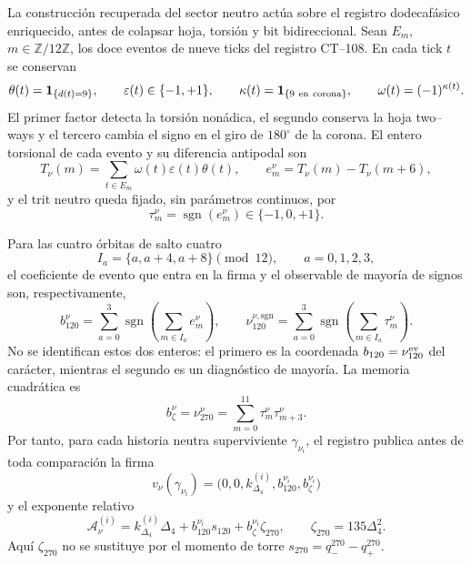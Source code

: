 La construcción recuperada del sector neutro actúa sobre el registro
dodecafásico enriquecido, antes de colapsar hoja, torsión y bit
bidireccional. Sean \(E_m\), \(m\in\mathbb Z/12\mathbb Z\), los doce
eventos de nueve ticks del registro CT--108. En cada tick \(t\) se conservan
\[
 \theta(t)=\mathbf1_{\{d(t)=9\}},\qquad
 \varepsilon(t)\in\{-1,+1\},\qquad
 \kappa(t)=\mathbf1_{\{9\ {\rm en\ corona}\}},
 \qquad \omega(t)=(-1)^{\kappa(t)}.
\]
El primer factor detecta la torsión nonádica, el segundo conserva la hoja
two--ways y el tercero cambia el signo en el giro de \(180^\circ\) de la
corona. El entero torsional de cada evento y su diferencia antipodal son
\begin{equation}
 T_\nu(m)=\sum_{t\in E_m}
   \omega(t)\varepsilon(t)\theta(t),\qquad
 e_m^\nu=T_\nu(m)-T_\nu(m+6),
 \label{eq:extractor-z0-torsion-antipodal-rev2}
\end{equation}
y el trit neutro queda fijado, sin parámetros continuos, por
\begin{equation}
 \tau_m^\nu=\operatorname{sgn}(e_m^\nu)
 \in\{-1,0,+1\}.
 \label{eq:trit-neutro-torsion-antipodal-rev2}
\end{equation}

Para las cuatro órbitas de salto cuatro
\[
 I_a=\{a,a+4,a+8\}\pmod{12},\qquad a=0,1,2,3,
\]
el coeficiente de evento que entra en la firma y el observable de mayoría
de signos son, respectivamente,
\begin{equation}
 b_{120}^\nu
 =\sum_{a=0}^{3}\operatorname{sgn}
   \left(\sum_{m\in I_a}e_m^\nu\right),
 \qquad
 \nu_{120}^{\nu,\mathrm{sgn}}
 =\sum_{a=0}^{3}\operatorname{sgn}
   \left(\sum_{m\in I_a}\tau_m^\nu\right).
 \label{eq:canales-120-neutros-distintos-rev2}
\end{equation}
No se identifican estos dos enteros: el primero es la coordenada
\(b_{120}=\nu_{120}^{\rm ev}\) del carácter, mientras el segundo es un
diagnóstico de mayoría. La memoria cuadrática es
\begin{equation}
 b_\zeta^\nu=\nu_{270}^\nu
 =\sum_{m=0}^{11}\tau_m^\nu\tau_{m+3}^\nu.
 \label{eq:canal-270-neutro-rev2}
\end{equation}
Por tanto, para cada historia neutra superviviente
\(\gamma_{\nu_i}\), el registro publica antes de toda comparación la firma
\[
 v_\nu(\gamma_{\nu_i})
 =\bigl(0,0,k_{\Delta_4}^{(i)},b_{120}^{\nu_i},
        b_\zeta^{\nu_i}\bigr)
\]
y el exponente relativo
\begin{equation}
 \mathcal A_\nu^{(i)}
 =k_{\Delta_4}^{(i)}\Delta_4
  +b_{120}^{\nu_i}s_{120}
  +b_\zeta^{\nu_i}\zeta_{270},
 \qquad
 \zeta_{270}=135\Delta_4^2.
 \label{eq:caracter-relativo-neutro-z0-rev2}
\end{equation}
Aquí \(\zeta_{270}\) no se sustituye por el momento de torre
\(s_{270}=q_-^{270}-q_+^{270}\).

